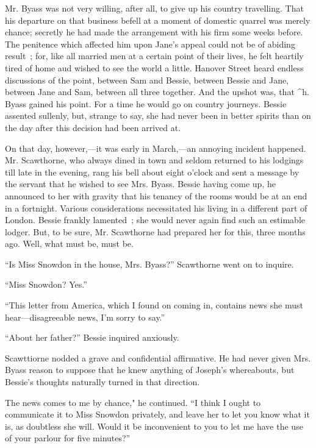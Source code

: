 Mr. Byass was not very willing, after all, to give up his country
travelling. That his departure on that business befell at a moment of
domestic quarrel was merely chance; secretly he had made the arrangement
with his firm some weeks before. The penitence which affected him upon
Jane's appeal could not be of abiding result~; for, like all married men
at a certain point of their lives, he felt heartily tired of home aud
wished to see the world a little. Hanover Street heard endless
discussions of the point, between Sam and Bessie, between Bessie and
Jane, between Jane and Sam, between all three together. And the upshot
was, that \^{}h. Byass gained his point. For a time he would go on
country journeys. {} Bessie assented sullenly, but, strange to say, she
had never been in better spirits than on the day after this decision had
been arrived at.

On that day, however,---it was early in March,---an annoying incident
happened. Mr. Scawthorne, who always dined in town and seldom returned
to his lodgings till late in the evening, rang his bell about eight
o'clock and sent a message by the servant that he wished to see Mrs.
Byass. Bessie having come up, he announced to her with gravity that his
tenancy of the rooms would be at an end in a fortnight. Various
considerations necessitated his living in a different part of London.
Bessie frankly lamented~; she would never again find such an estimable
lodger. But, to be sure, Mr. Scawthorne had prepared her for this, three
months ago. Well, what must be, must be.

``Is Miss Snowdon in the house, Mrs. Byass?'' Scawthorne went on to
inquire.

``Miss Snowdon? Yes.''

``This letter from America, which I found on coming in, contains news
she must hear---disagreeable news, I'm sorry to say.''

``About her father?'' Bessie inquired anxiously.

{} Scawttiorne nodded a grave and confidential affirmative. He had never
given Mrs. Byass reason to suppose that he knew anything of Joseph's
whereabouts, but Bessie's thoughts naturally turned in that direction.

The news comes to me by chance," he continued. ``I think I ought to
communicate it to Miss Snowdon privately, and leave her to let you know
what it is, as doubtless she will. Would it be inconvenient to you to
let me have the use of your parlour for five minutes?''


